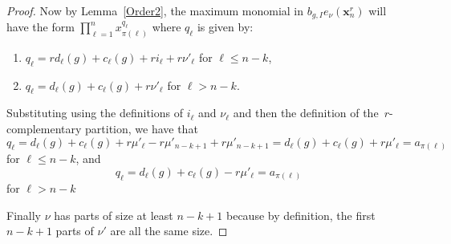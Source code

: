 \documentclass[10pt]{article}
\begin{document}
\begin{lemm}
\begin{proof}
	Now by Lemma~\ref{Order2}, the maximum monomial in $b_{g,I}e_\nu(\mathbf{x}_n^r)$ will have the form $\prod_{\ell=1}^n 
x_{\pi(\ell)}^{q_{\ell}}$ where $q_\ell$ is given by:

	\begin{enumerate}

		\item $q_\ell=rd_\ell(g)+c_\ell(g)+ri_\ell+r\nu'_\ell$ for $\ell\leq n-k$,

		\item $q_\ell=d_\ell(g)+c_\ell(g)+r\nu'_\ell$ for $\ell> n-k$.

	\end{enumerate}

Substituting using the definitions of $i_\ell$ and $\nu_\ell$ and then the definition of the~$r$-complementary partition, we 
have 
that
\begin{equation}
q_\ell=d_\ell(g)+c_\ell(g)+r\mu'_\ell-r\mu'_{n-k+1}+r\mu'_{n-k+1}=d_\ell(g)+c_\ell(g)+r\mu'_\ell=a_{\pi(\ell)
}
\end{equation}
for $\ell\leq n-k$, and
\begin{equation}
q_\ell=d_\ell(g)+c_\ell(g)-r\mu'_\ell=a_{\pi(\ell)}
\end{equation}
for $\ell>n-k$


Finally $\nu$ has parts of size at least $n-k+1$ because by definition, the first $n-k+1$ parts of $\nu'$ are all the same size.
	\end{proof}
\end{lemm}
\end{document}
